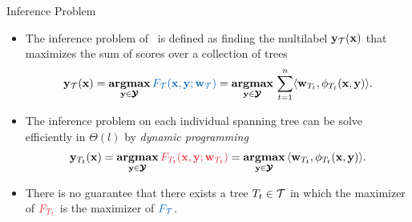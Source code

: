 \documentclass[first=dgreen,second=purple,logo=yellowexc]{aaltoslides}
\begin{document}
%
\begin{frame}{Inference Problem}
	\begin{itemize}
		\item The inference problem of \rta\ is defined as finding the multilabel $\mathbf {y}_{\mathcal{T}}(\mathbf {x})$ that maximizes the sum of scores over a collection of trees
		\begin{align*}
			\vy_{\Tcal}(\vx) = \underset{\vy\in\vYcal}{\argmax}\,{\color{aaltoblue}F_{\Tcal}(\vx,\vy;\vw_{\Tcal})} = \underset{\vy\in\vYcal}{\argmax}\,\sum_{t=1}^{n}\ip{\vw_{T_t}}{\phi_{T_t}(\vx,\vy)}.
		\end{align*}
		\item The inference problem on each individual spanning tree can be solve efficiently in $\Theta(l)$ by \textit{dynamic programming}
		\begin{align*}
			\vy_{T_t}(\vx) = \underset{\vy\in\vYcal}{\argmax}\,{\color{aaltored}F_{T_t}(\vx,\vy;\vw_{T_t})}= \underset{\vy\in\vYcal}{\argmax}\,\ip{\vw_{T_t}}{\phi_{T_t}(\vx,\vy)}.
		\end{align*}
		\item There is no guarantee that there exists a tree $T_t\in\mathcal{T}$ in which the maximizer of ${\color{aaltored}F_{T_t}}$ is the maximizer of ${\color{aaltoblue}F_{\Tcal}}$.
	\end{itemize}
\end{frame}
\end{document}
